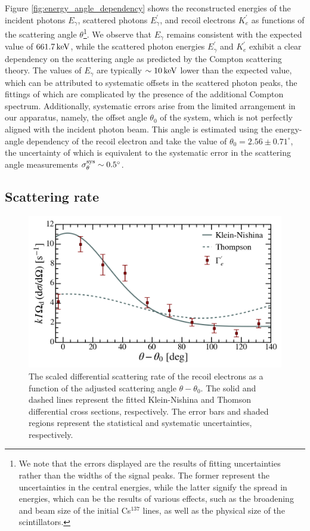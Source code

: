 \documentclass[aps,twocolumn,secnumarabic,balancelastpage,amsmath,amssymb,nofootinbib,floatfix]{revtex4-1}
\newcommand{\keV}{\,{\rm keV}}
\begin{document}
Figure \ref{fig:energy_angle_dependency} shows the reconstructed energies of the incident photons $E_\gamma$, scattered photons $E_\gamma^{\prime}$, and recoil electrons $K_e^{\prime}$ as functions of the scattering angle $\theta$\footnote{We note that the errors displayed are the results of fitting uncertainties rather than the widths of the signal peaks. The former represent the uncertainties in the central energies, while the latter signify the spread in energies, which can be the results of various effects, such as the broadening and beam size of the initial Cs$^{137}$ lines, as well as the physical size of the scintillators.}. We observe that $E_\gamma$ remains consistent with the expected value of $661.7\keV$, while the scattered photon energies $E_\gamma^{\prime}$ and $K_e^{\prime}$ exhibit a clear dependency on the scattering angle as predicted by the Compton scattering theory. The values of $E_\gamma$ are typically $\sim 10\keV$ lower than the expected value, which can be attributed to systematic offsets in the scattered photon peaks, the fittings of which are complicated by the presence of the additional Compton spectrum. Additionally, systematic errors arise from the limited arrangement in our apparatus, namely, the offset angle $\theta_0$ of the system, which is not perfectly aligned with the incident photon beam. This angle is estimated using the energy-angle dependency of the recoil electron and take the value of $\theta_0 = 2.56 \pm 0.71^\circ$, the uncertainty of which is equivalent to the systematic error in the scattering angle measurements $\sigma_\theta^{\rm{sys}} \sim 0.5^\circ$.

\subsection{Scattering rate}
\label{ssec:scattering_rate}

\begin{figure}
    \centering
    \includegraphics[width=0.49 \textwidth]{Figures/scattering_rate.png}
    \caption{The scaled differential scattering rate of the recoil electrons as a function of the adjusted scattering angle $\theta - \theta_0$. The solid and dashed lines represent the fitted Klein-Nishina and Thomson differential cross sections, respectively. The error bars and shaded regions represent the statistical and systematic uncertainties, respectively.}
    \label{fig:scattering_rate}
\end{figure}
\end{document}
